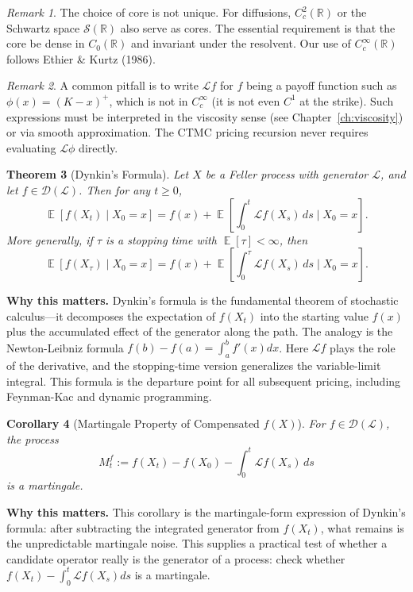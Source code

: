 \documentclass[11pt,a4paper,openany]{book}
\theoremstyle{definition}
\theoremstyle{plain}
\newtheorem{theorem}{Theorem}[chapter]
\newtheorem{corollary}[theorem]{Corollary}
\theoremstyle{remark}
\newtheorem{remark}[theorem]{Remark}
\DeclareMathOperator{\E}{\mathbb{E}}
\newcommand{\1}{\mathbbm{1}}
\newcommand{\R}{\mathbb{R}}
\newcommand{\calL}{\mathcal{L}}
\newcommand{\calD}{\mathcal{D}}
\begin{document}
\begin{remark}
The choice of core is not unique. For diffusions, $C_{c}^{2}(\R)$ or the Schwartz space $\mathcal{S}(\R)$ also serve as cores. The essential requirement is that the core be dense in $C_{0}(\R)$ and invariant under the resolvent. Our use of $C_{c}^{\infty}(\R)$ follows Ethier \& Kurtz (1986).
\end{remark}

\begin{remark}
A common pitfall is to write $\mathcal{L} f$ for $f$ being a payoff function such as $\phi(x) = (K-x)^{+}$, which is not in $C_{c}^{\infty}$ (it is not even $C^{1}$ at the strike). Such expressions must be interpreted in the viscosity sense (see Chapter~\ref{ch:viscosity}) or via smooth approximation. The CTMC pricing recursion never requires evaluating $\mathcal{L} \phi$ directly.
\end{remark}

\begin{theorem}[Dynkin's Formula]
Let $X$ be a Feller process with generator $\calL$, and let $f \in \calD(\calL)$. Then for any $t \geq 0$,
\[
\E[f(X_{t}) \mid X_{0} = x] = f(x) + \E\left[\int_{0}^{t} \calL f(X_{s}) \, ds \mid X_{0} = x\right].
\]
More generally, if $\tau$ is a stopping time with $\E[\tau] < \infty$, then
\[
\E[f(X_{\tau}) \mid X_{0} = x] = f(x) + \E\left[\int_{0}^{\tau} \calL f(X_{s}) \, ds \mid X_{0} = x\right].
\]
\end{theorem}

\medskip
\noindent\textbf{Why this matters.} Dynkin's formula is the fundamental theorem of stochastic calculus---it decomposes the expectation of $f(X_t)$ into the starting value $f(x)$ plus the accumulated effect of the generator along the path. The analogy is the Newton-Leibniz formula $f(b) - f(a) = \int_a^b f'(x) dx$. Here $\mathcal{L} f$ plays the role of the derivative, and the stopping-time version generalizes the variable-limit integral. This formula is the departure point for all subsequent pricing, including Feynman-Kac and dynamic programming.

\begin{corollary}[Martingale Property of Compensated $f(X)$]
For $f \in \calD(\calL)$, the process
\[
M_{t}^{f} := f(X_{t}) - f(X_{0}) - \int_{0}^{t} \calL f(X_{s}) \, ds
\]
is a martingale.
\end{corollary}

\medskip
\noindent\textbf{Why this matters.} This corollary is the martingale-form expression of Dynkin's formula: after subtracting the integrated generator from $f(X_t)$, what remains is the unpredictable martingale noise. This supplies a practical test of whether a candidate operator really is the generator of a process: check whether $f(X_t) - \int_0^t \mathcal{L}f(X_s)ds$ is a martingale.
\end{document}
